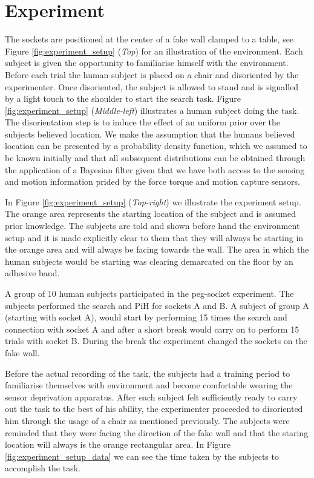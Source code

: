 \cite{approx_rl_overview_2011} %


\section{Experiment}\label{ch4:experiment}

The sockets are positioned at the center of a fake wall clamped to a table, see Figure \ref{fig:experiment_setup} (\textit{Top})
for an illustration of the environment. Each subject is given the opportunity to familiarise himself with 
the environment. Before each trial the human subject is placed on a chair and disoriented by the experimenter. Once disoriented,
the subject is allowed to stand and is signalled by a light touch to the shoulder to start the search task.
Figure \ref{fig:experiment_setup} (\textit{Middle-left}) illustrates a human subject doing the task. The disorientation
step is to induce the effect of an uniform prior over the subjects believed location. We make the assumption that the humans 
believed location can be presented by a probability density function, which we assumed to be known initially and that 
all subsequent distributions can be obtained through the application of a Bayesian filter given that we have both 
access to the sensing and motion information prided by the force torque and motion capture sensors.

In Figure \ref{fig:experiment_setup} (\textit{Top-right}) we illustrate the experiment setup. The orange area represents 
the starting location of the subject and is assumed prior knowledge. The subjects are told and shown before hand the environment setup
and it is made explicitly clear to them that they will always be starting in the orange area and will always be facing towards 
the wall. The area in which the human subjects would be starting was clearing demarcated on the floor by an adhesive band.

A group of 10 human subjects participated in the peg-socket experiment. The subjects performed the search and PiH 
for sockets A and B. A subject of group A (starting with socket A), would start by performing 15 times the search and connection 
with socket A and after a short break would carry on to perform 15 trials with socket B. During the break
the experiment changed the sockets on the fake wall.

Before the actual recording of the task, the subjects had a training period to familiarise themselves 
with environment and become comfortable wearing the sensor deprivation apparatus. After each subject felt sufficiently
ready to carry out the task to the best of his ability, the experimenter proceeded to disoriented him through 
the usage of a chair as mentioned previously. The subjects were reminded that they were facing the direction of 
the fake wall and that the staring location will always is the orange rectangular area. In Figure \ref{fig:experiment_setup_data}
we can see the time taken by the subjects to accomplish the task. 

